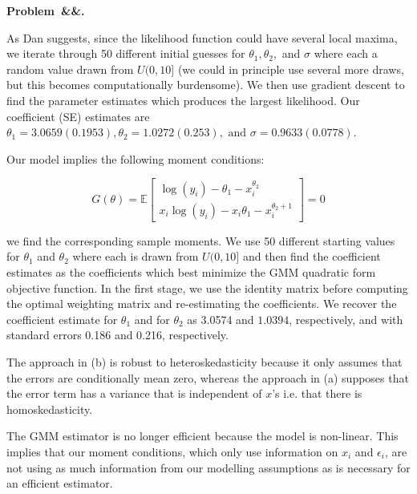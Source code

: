 \documentclass[12pt]{article}
\newcommand{\E}{\mathbb{E}}
\newcounter{problem}
\newenvironment{problem}[1][]{
    \newpage %
    \refstepcounter{problem}\par\noindent
    \textbf{Problem~\theproblem\ifx&#1&\else.~#1\fi}\rmfamily\par\vspace{0.5em}
}{\vspace{1em}}
\begin{document}
\begin{problem}
    
    \begin{subproblems}
        \item As Dan suggests, since the likelihood function could have several local maxima, we iterate through 50 different initial guesses for $\theta_1, \theta_2,$ and $\sigma$ where each a random value drawn from  $U(0, 10]$ (we could in principle use several more draws, but this becomes computationally burdensome). We then use gradient descent to find the parameter estimates which produces the largest likelihood. Our coefficient (SE) estimates are $\theta_1 = 3.0659 (0.1953), \theta_2 = 1.0272 (0.253), \text{ and } \sigma = 0.9633 (0.0778)$. 

        \item Our model implies the following moment conditions: 
        
        $$G(\theta) = \E\begin{bmatrix}
            \log(y_i) - \theta_1 - x_i^{\theta_2} \\
            x_i\log(y_i) - x_i\theta_1 - x_i^{\theta_2 + 1}
        \end{bmatrix} = 0$$

        we find the corresponding sample moments. We use 50 different starting values for $\theta_1$ and $\theta_2$ where each is drawn from $U(0, 10]$ and then find the coefficient estimates as the coefficients which best minimize the GMM quadratic form objective function. In the first stage, we use the identity matrix before computing the optimal weighting matrix and re-estimating the coefficients. We recover the coefficient estimate for $\theta_1$ and for $\theta_2$ as 3.0574 and $1.0394$, respectively, and with standard errors 0.186 and 0.216, respectively. 

        \medskip

        The approach in (b) is robust to heteroskedasticity because it only assumes that the errors are conditionally mean zero, whereas the approach in (a) supposes that the error term has a variance that is independent of $x$'s i.e. that there is homoskedasticity. 

        \medskip

        The GMM estimator is no longer efficient because the model is non-linear. This implies that our moment conditions, which only use information on $x_i$ and $\epsilon_i$, are not using as much information from our modelling assumptions as is necessary for an efficient estimator.

    \end{subproblems}
\end{problem}
\end{document}
